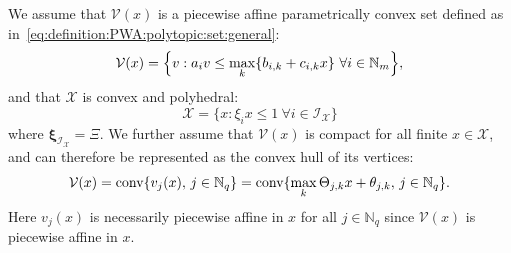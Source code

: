 \documentclass[journal]{IEEEtran}
\newcommand{\todo}[2]{%
  \providetoggle{#1}%
    \iftoggle{#1}{%
    {\color{red}#2}%
    }{#2}%
}
\providecommand{\conv}{\text{conv}}
\theoremstyle{remark}
\theoremstyle{definition}
\begin{document}

We assume that $\mathcal V(x)$ is a piecewise affine parametrically convex 
set defined as in~\eqref{eq:definition:PWA:polytopic:set:general}:
\begin{equation}\label{eq:definition:PWA:polytopic:set:cl}
\mathcal{V}(x) = \Bigl\{ v : a_i v \leq\max_{k} \{ b_{i,k} + c_{i,k} x\} \ \forall i \in\mathbb N_m\Bigr\} ,
\end{equation}
%
and that $\mathcal{X}$ is convex and polyhedral:
\begin{equation}\label{eq:definition:polytopic:X}
\mathcal{X}=\{x : \xi_i x \leq 1\ \forall i \in\mathcal{I}_{\mathcal{X}} \} 
\end{equation}
where $\boldsymbol{\xi}_{\mathcal{I}_{\mathcal{X}}}=\Xi$.
%
We further assume 
that $\mathcal V(x)$ is compact for all finite $x\in\mathcal X$,
and can therefore be represented as the 
convex hull of its vertices: 
\begin{equation}\label{eq:definition:PWA:polytopic:set:vertices}
\mathcal V(x) = \conv\{v_j(x), \, j\in\mathbb{N}_q\} 
=  \conv\{\todo{Manuel:convHull}{\max_{k}}
\Theta_{j\todo{Manuel:convHull}{,k}} x + \theta_{j\todo{Manuel:convHull}{,k}},\, j\in\mathbb{N}_q\}.
\end{equation}
%
Here $v_j(x)$ is necessarily piecewise affine in $x$ for all $j\in\mathbb{N}_q$ since ${\mathcal{V}}(x)$ is piecewise affine in $x$.
%
\end{document}
